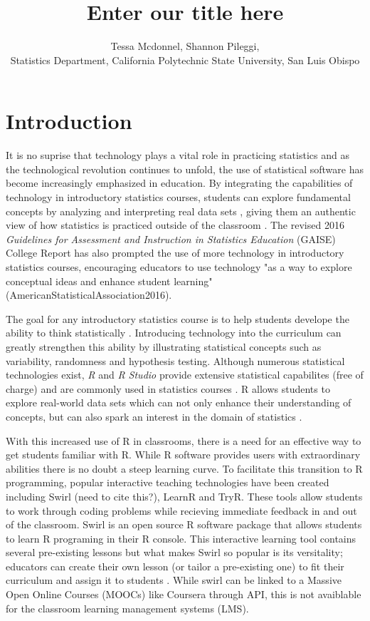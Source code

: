 \documentclass[12pt]{article}
\title{Enter our title here}
\author{Tessa Mcdonnel, Shannon Pileggi,  \\Statistics Department, California Polytechnic State University, San Luis Obispo}
\begin{document}
\maketitle

\section{Introduction}


It is no suprise that technology plays a vital role in practicing statistics and as the technological revolution continues to
unfold, the use of statistical software has become increasingly emphasized in education. By integrating the
capabilities of technology in introductory statistics courses, students can explore fundamental concepts by analyzing and
interpreting real data sets \cite{Chance2007}, giving them an authentic view of how statistics is practiced outside of the
classroom \cite{Wang2017}. The revised 2016 \textit{Guidelines for Assessment and Instruction in Statistics Education}
(GAISE) College Report has also prompted the use of more technology in introductory statistics courses, encouraging educators
to use technology "as a way to explore conceptual ideas and enhance student learning" (AmericanStatisticalAssociation2016).

The goal for any introductory statistics course is to help students develope the ability to think statistically
\cite{AmericanStatisticalAssociation2016}.
Introducing technology into the curriculum can greatly strengthen this ability by illustrating statistical concepts such as
variability, randomness and hypothesis testing. Although numerous statistical technologies exist, \textit{R} and \textit{R Studio}
provide extensive statistical capabilites (free of charge) and are commonly used in statistics courses \cite{Chance2007}. R
allows students to explore real-world data sets which can not only enhance their understanding of concepts, but can also spark
an interest in the domain of statistics \cite{Wang2017}.

With this increased use of R in classrooms, there is a need for an effective way to get students familiar with R. While R
software provides users with extraordinary abilities there is no doubt a steep learning curve. To facilitate this transition
to R programming, popular interactive teaching technologies have been created including Swirl (need to cite this?), LearnR
and TryR. These tools
allow students to work through coding problems while recieving immediate feedback in and out of the classroom. Swirl is an
open source R software package that allows students to learn R programing in their R console. This interactive learning tool
contains several pre-existing lessons but what makes Swirl so popular is its versitality; educators can create their own
lesson (or tailor a pre-existing one) to fit their curriculum and assign it to students \cite{Carchedi2014}.
While swirl can be linked to a Massive Open Online Courses (MOOCs) like Coursera through API, this is not avaiblable for the classroom
learning management systems (LMS).
\end{document}
